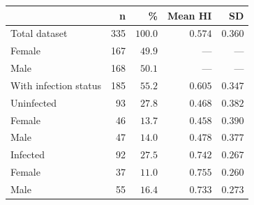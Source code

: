 \begin{longtable}{lrrrr}
\toprule
 & n & \% & Mean HI & SD \\ 
\midrule\addlinespace[2.5pt]
Total dataset & 335 & $100.0$ & $0.574$ & $0.360$ \\ 
  Female & 167 & $49.9$ & — & — \\ 
  Male & 168 & $50.1$ & — & — \\ 
With infection status & 185 & $55.2$ & $0.605$ & $0.347$ \\ 
  Uninfected & 93 & $27.8$ & $0.468$ & $0.382$ \\ 
    Female & 46 & $13.7$ & $0.458$ & $0.390$ \\ 
    Male & 47 & $14.0$ & $0.478$ & $0.377$ \\ 
  Infected & 92 & $27.5$ & $0.742$ & $0.267$ \\ 
    Female & 37 & $11.0$ & $0.755$ & $0.260$ \\ 
    Male & 55 & $16.4$ & $0.733$ & $0.273$ \\ 
\bottomrule
\end{longtable}

